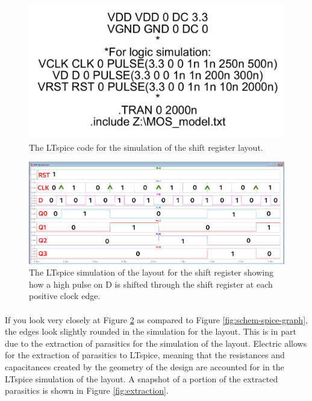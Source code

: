 \documentclass{article}
\begin{document}
  \begin{figure}[H]
    \centering
    \includegraphics[width=0.5\linewidth, frame]{screenshots/spice-sim.png}
    \caption{The LTspice code for the simulation of the shift register layout.}
    \label{fig:spice-sim-lay}
  \end{figure}

  \begin{figure}[H]
    \centering
    \includegraphics[width=\linewidth, frame]{screenshots/lay-spice-graph.png}
    \caption{The LTspice simulation of the layout for the shift register showing how a high pulse on D is shifted through the shift register at each positive clock edge.}
    \label{fig:lay-spice-graph}
  \end{figure}

  \paragraph{}
  If you look very closely at Figure \ref{fig:lay-spice-graph} as compared to Figure \ref{fig:schem-spice-graph}, the edges look slightly rounded in the simulation for the layout. This is in part due to the extraction of parasitics for the simulation of the layout. Electric allows for the extraction of parasitics to LTspice, meaning that the resistances and capacitances created by the geometry of the design are accounted for in the LTspice simulation of the layout. A snapshot of a portion of the extracted parasitics is shown in Figure \ref{fig:extraction}.
\end{document}

